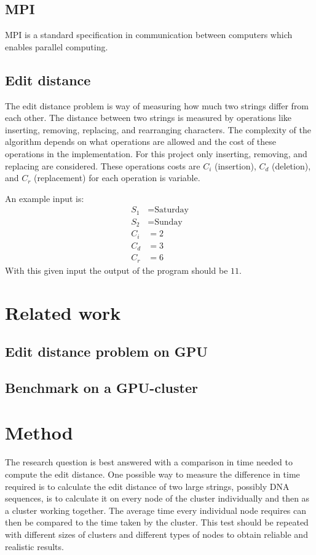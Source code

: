 \documentclass{sig-alternate-br}
\begin{document}
\subsection{MPI}
MPI is a standard specification in communication between computers which enables parallel computing.


\subsection{Edit distance}
The edit distance problem is way of measuring how much two strings differ from each other.
The distance between two strings is measured by operations like inserting, removing, replacing, and rearranging characters.
The complexity of the algorithm depends on what operations are allowed and the cost of these operations in the implementation.
For this project only inserting, removing, and replacing are considered.
These operations costs are $C_i$ (insertion), $C_d$ (deletion), and $C_r$ (replacement) for each operation is variable.

An example input is:
\begin{align*}
S_1 &= \text{Saturday}\\
S_2 &= \text{Sunday}\\
C_i &= 2\\
C_d &= 3\\
C_r &= 6
\end{align*}
With this given input the output of the program should be $11$.

\section{Related work}
\subsection{Edit distance problem on GPU}
\subsection{Benchmark on a GPU-cluster}
\section{Method}
The research question is best answered with a comparison in time needed to compute the edit distance.
One possible way to measure the difference in time required is to calculate the edit distance of two large strings, possibly DNA sequences, is to calculate it on every node of the cluster individually and then as a cluster working together.
The average time every individual node requires can then be compared to the time taken by the cluster.
This test should be repeated with different sizes of clusters and different types of nodes to obtain reliable and realistic results.
\end{document}
